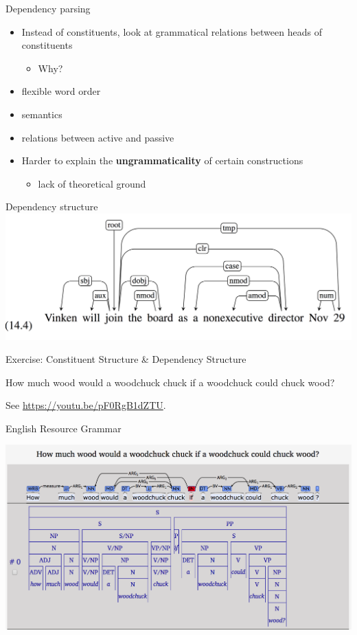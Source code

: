 \documentclass{beamer}
\begin{document}
\begin{frame}{Dependency parsing}

  \begin{itemize}
  \item Instead of constituents, look at grammatical relations between heads of constituents
    \begin{itemize}
    \item Why?
    \end{itemize}
  \item flexible word order
  \item semantics
  \item relations between active and passive
  \item Harder to explain the {\bf ungrammaticality} of certain constructions
    \begin{itemize}
    \item lack of theoretical ground
    \end{itemize}
  \end{itemize}
\end{frame}

\begin{frame}{Dependency structure}
  \includegraphics[width=\textwidth]{figures/dep1}
\end{frame}


\begin{frame}{Exercise: Constituent Structure \& Dependency Structure}

  How much wood would a woodchuck chuck if a woodchuck could chuck
  wood?

  See \url{https://youtu.be/pF0RgB1dZTU}.
\end{frame}

\begin{frame}{English Resource Grammar}

  \includegraphics[width=\textwidth]{figures/woodchuck}

\end{frame}
\end{document}
